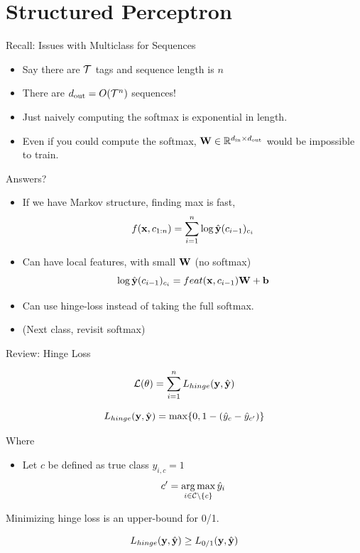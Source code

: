 \documentclass{beamer}
\begin{document}
\section{Structured Perceptron}

\begin{frame}{Recall: Issues with Multiclass for Sequences }
  \begin{itemize}
  \item Say there are $\mathcal{T}$ tags and sequence length is $n$
    \air 

  \item There are ${d_{\mathrm{out}}} = O(\mathcal{T}^n)$ sequences! 
    \air 
  \item Just naively computing the softmax is exponential in length. 
    \air 

  \item Even if you could compute the softmax, $\mathbf{W} \in \mathbb{R}^{{d_{\mathrm{in}}} \times {d_{\mathrm{out}}}}$ would 
    be impossible to train.
  \end{itemize}
\end{frame}


\begin{frame}{Answers?}
  \begin{itemize}
  \item If we have Markov structure, finding max is fast,
    \[ f(\mathbf{x}, c_{1:n})  = \sum_{i=1}^n \log \hat{\mathbf{y}}(c_{i-1})_{c_i}\]   
    \air 

  \item Can have local features, with small $\mathbf{W}$ (no softmax)
    \[\log \hat{\mathbf{y}}(c_{i-1})_{c_i} = feat(\mathbf{x}, c_{i-1}) \mathbf{W} + \mathbf{b}\]
    
    \air 

  \item Can use hinge-loss instead of taking the full softmax. 

    \air 
  \item (Next class, revisit softmax)
  \end{itemize}

\end{frame}

\begin{frame}{Review: Hinge Loss}

  \[{\mathcal{L}(\theta)} = \sum_{i=1}^n L_{hinge}(\mathbf{y},\hat{\mathbf{y}}) \] 


  \[ L_{hinge}(\mathbf{y}, \hat{\mathbf{y}}) =  \max\{0, 1 - (\hat{y}_{c} - \hat{y}_{c'}) \}  \]

  Where 
  \begin{itemize}
  \item   Let $c$ be defined as true class $y_{i, c} = 1$  
    \[c' = \argmax_{i \in \mcC \setminus\{c\}} \hat{y}_i \] 
  \end{itemize}

  \pause

  Minimizing hinge loss is an upper-bound for 0/1. 

  \[ L_{hinge}(\mathbf{y}, \hat{\mathbf{y}}) \geq L_{0/1}(\mathbf{y}, \hat{\mathbf{y}})\] 
\end{frame}
\end{document}
